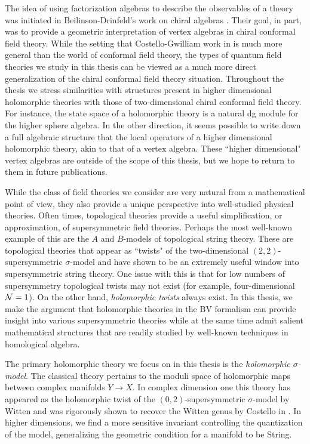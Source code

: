 The idea of using factorization algebras to describe the observables of a theory was initiated in Beilinson-Drinfeld's work on chiral algebras \cite{BD}. 
Their goal, in part, was to provide a geometric interpretation of vertex algebras in chiral conformal field theory. 
While the setting that Costello-Gwilliam work in is much more general than the world of conformal field theory, the types of quantum field theories we study in this thesis can be viewed as a much more direct generalization of the chiral conformal field theory situation. 
Throughout the thesis we stress similarities with structures present in higher dimensional holomorphic theories with those of two-dimensional chiral conformal field theory. 
For instance, the state space of a holomorphic theory is a natural dg module for the higher sphere algebra.   
In the other direction, it seems possible to write down a full algebraic structure that the local operators of a higher dimensional holomorphic theory, akin to that of a vertex algebra. 
These ``higher dimensional" vertex algebras are outside of the scope of this thesis, but we hope to return to them in future publications. 

While the class of field theories we consider are very natural from a mathematical point of view, they also provide a unique perspective into well-studied physical theories. 
Often times, topological theories provide a useful simplification, or approximation, of supersymmetric field theories. 
Perhaps the most well-known example of this are the $A$ and $B$-models of topological string theory.
These are topological theories that appear as ``twists" of the two-dimensional $(2,2)$-supersymmetric $\sigma$-model and have shown to be an extremely useful window into supersymmetric string theory. 
One issue with this is that for low numbers of supersymmetry topological twists may not exist (for example, four-dimensional $\mathcal N=1$).
On the other hand, {\em holomorphic twists} always exist. 
In this thesis, we make the argument that holomorphic theories in the BV formalism can provide insight into various supersymmetric theories while at the same time admit salient mathematical structures that are readily studied by well-known techniques in homological algebra.

The primary holomorphic theory we focus on in this thesis is the {\em holomorphic $\sigma$-model}. 
The classical theory pertains to the moduli space of holomorphic maps between complex manifolds $Y \to X$. 
In complex dimension one this theory has appeared as the holomorphic twist of the $(0,2)$-supersymmetric $\sigma$-model by Witten \cite{WittenCDO} and was rigorously shown to recover the Witten genus by Costello in \cite{WG2}. 
In higher dimensions, we find a more sensitive invariant controlling the quantization of the model, generalizing the geometric condition for a manifold to be {\rm String}.

